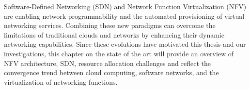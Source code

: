 Software-Defined Networking (SDN) and Network Function Virtualization (NFV) are enabling network programmability and the automated provisioning of virtual networking services. Combining these new paradigms can overcome the limitations of traditional clouds
and networks by enhancing their dynamic networking capabilities. Since these evolutions
have motivated this thesis and our investigations, this chapter on the state of the art will
provide an overview of NFV architecture, SDN, resource allocation challenges and reflect
the convergence trend between cloud computing, software networks, and the virtualization
of networking functions.
